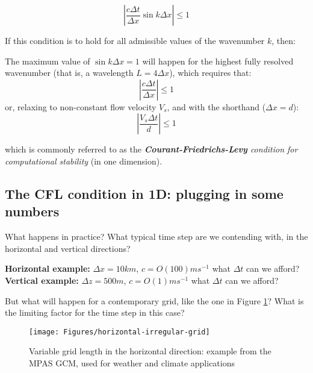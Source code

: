 	\begin{equation}
		\left | \frac {c \Delta t}{\Delta x} \sin k \Delta x \right | \leq 1
	\end{equation}	
	
	If this condition is to hold for all admissible values of the wavenumber $k$, then:
	
	
	\begin{definition}		
	The maximum value of $\sin k \Delta x = 1$ will happen for the highest fully resolved wavenumber (that is, a wavelength $L=4 \Delta x$), which requires that:
	\begin{equation}
		\left | \frac {c \Delta t}{\Delta x}  \right | \leq 1
	\end{equation}
	  or, relaxing to non-constant flow velocity $V_s$, and with the shorthand ($\Delta x = d$):
		\begin{equation}	
			 \left | \frac {V_s \Delta t}{d}  \right |  \leq 1
	\end{equation}	
	\end{definition}

	which is commonly referred to as the \emph{\textbf{Courant-Friedrichs-Levy} condition for computational stability} (in one dimension).

\subsection{The CFL condition in 1D: plugging in some numbers}

What happens in practice? What typical time step are we contending with, in the horizontal and vertical directions?

\begin{exercise}
	{\bf Horizontal example:} $\Delta x = 10km$, $c = O(100) ms^{-1}$ what $\Delta t$ can we afford?
	{\bf Vertical example:} $\Delta z = 500m$, $c = O(1) ms^{-1}$ what $\Delta t$ can we afford?
\end{exercise}	
		
But what will happen for a contemporary grid, like the one in Figure  \ref{horizontal-grid-stretch}? What is the limiting factor for the time step in this case?

	\begin{figure}[h!]
			\begin{center}
		\texttt{[image: Figures/horizontal-irregular-grid]}
		\end{center}
		\caption{Variable grid length in the horizontal direction: example from the MPAS GCM, used for weather and climate applications}
			\label{horizontal-grid-stretch}
	\end{figure}

